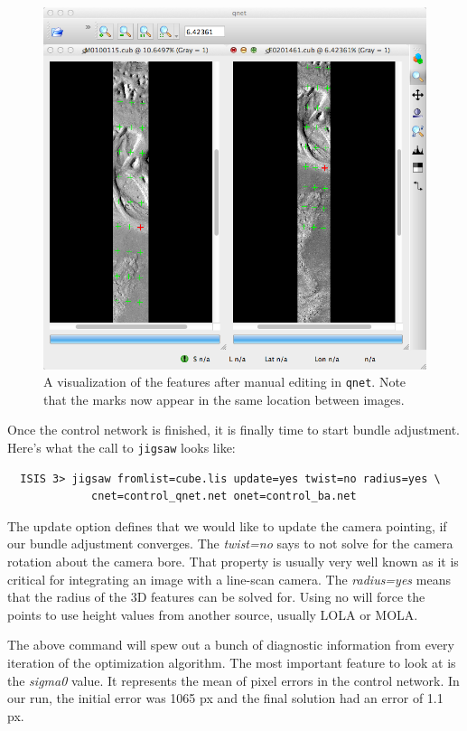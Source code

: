 \begin{figure}[ht]
  \centering
  \includegraphics[width=5in]{images/qnet/Qnet_AfterQnetManual.png}
  \caption{A visualization of the features after manual editing in
    \texttt{qnet}. Note that the marks now appear in the same location
    between images.}
  \label{fig:after_manual}
\end{figure}

Once the control network is finished, it is finally time to start
bundle adjustment. Here's what the call to \texttt{jigsaw} looks like:

\begin{verbatim}
  ISIS 3> jigsaw fromlist=cube.lis update=yes twist=no radius=yes \
             cnet=control_qnet.net onet=control_ba.net
\end{verbatim}

The update option defines that we would like to update the camera
pointing, if our bundle adjustment converges. The \textit{twist=no}
says to not solve for the camera rotation about the camera bore. That
property is usually very well known as it is critical for integrating
an image with a line-scan camera. The \textit{radius=yes} means that
the radius of the 3D features can be solved for. Using no will force
the points to use height values from another source, usually LOLA or
MOLA.

The above command will spew out a bunch of diagnostic information from
every iteration of the optimization algorithm. The most important
feature to look at is the \textit{sigma0} value. It represents the mean of
pixel errors in the control network. In our run, the initial error was
1065 px and the final solution had an error of 1.1 px.

